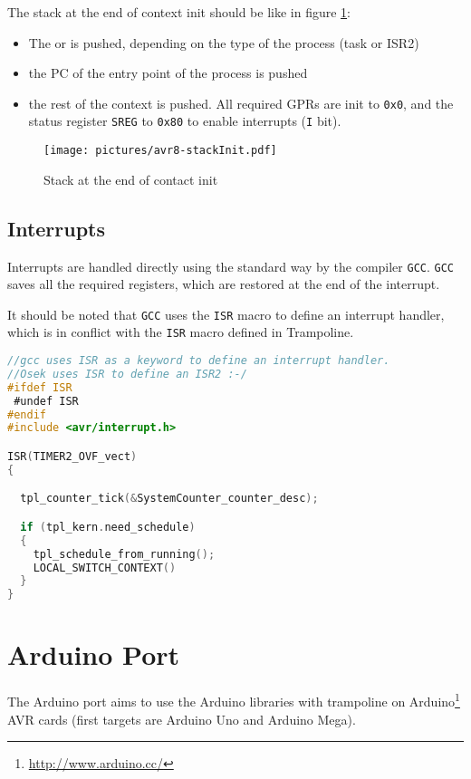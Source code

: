 The stack at the end of context init should be like in figure \ref{fig:avr8-stackInit}:
\begin{itemize}
\item The  or  is pushed, depending on the type of the process (task or ISR2)
\item the PC of the entry point of the process is pushed
\item the rest of the context is pushed. All required GPRs are init to \texttt{0x0}, and the status register \texttt{SREG} to \texttt{0x80} to enable interrupts (\texttt{I} bit).
\end{itemize}
\begin{figure}[htbp] %
\begin{minipage}{0.4\textwidth}
    \centering
  \texttt{[image: pictures/avr8-stackInit.pdf]} 
\end{minipage}
\begin{minipage}{0.6\textwidth}
  \caption{Stack at the end of contact init}\label{fig:avr8-stackInit}
\end{minipage}
\end{figure}

\subsection{Interrupts}
Interrupts are handled directly using the standard way by the compiler \texttt{GCC}. \texttt{GCC} saves all the required registers, which are restored at the end of the interrupt.

It should be noted that \texttt{GCC} uses the \texttt{ISR} macro to define an interrupt handler, which is in conflict with the \texttt{ISR} macro defined in Trampoline.

\begin{lstlisting}[language=C]
//gcc uses ISR as a keyword to define an interrupt handler.
//Osek uses ISR to define an ISR2 :-/
#ifdef ISR
 #undef ISR
#endif
#include <avr/interrupt.h>

ISR(TIMER2_OVF_vect)
{

  tpl_counter_tick(&SystemCounter_counter_desc);

  if (tpl_kern.need_schedule)
  {
    tpl_schedule_from_running();
    LOCAL_SWITCH_CONTEXT()
  }
}	
\end{lstlisting}

\section{Arduino Port}
The Arduino port aims to use the Arduino libraries with trampoline on Arduino\footnote{\url{http://www.arduino.cc/}} AVR cards (first targets are Arduino Uno and Arduino Mega).

